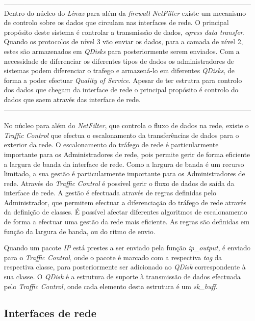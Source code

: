 ------------------------------------------------------------------------------------------------------------
 Dentro do núcleo do \textit{Linux} para além da \textit{firewall NetFilter} existe um mecanismo de controlo sobre os dados que circulam nas interfaces de rede.
 O principal propósito deste sistema é controlar a transmissão de dados, \textit{egress data transfer}.
 Quando os protocolos de nível 3 vão enviar os dados, para a camada de nível 2, estes são armazenados em \textit{QDisks} para posteriormente serem enviados.
 Com a necessidade de diferenciar os diferentes tipos de dados os administradores de sistemas podem diferenciar o trafego e armazená-lo em diferentes \textit{QDisks}, de forma a poder efectuar \textit{Quality of Service}.
Apesar de ter estrutra para controlo dos dados que chegam da interface de rede o principal propósito é controlo do dados que saem através das interface de rede.
------------------------------------------------------------------------------------------------------------

No núcleo para além do \textit{NetFilter}, que controla o fluxo de dados na rede, existe o \textit{Traffic Control} que efectua o escalonamento da transferências de dados para o exterior da rede.
O escalonamento do tráfego de rede é particularmente importante para os Administradores de rede, pois permite gerir de forma eficiente a largura de banda da interface de rede.
Como a largura de banda é um recurso limitado, a sua gestão é particularmente importante para os Administradores de rede.
Através do \textit{Traffic Control} é possível gerir o fluxo de dados de saída da interface de rede.
A gestão é efectuada através de regras definidas pelo Administrador, que permitem efectuar a diferenciação do tráfego de rede através da definição de classes.
É possível afectar diferentes algoritmos de escalonamento de forma a efectuar uma gestão da rede mais eficiente.
As regras são definidas em função da largura de banda, ou do ritmo de envio.

Quando um pacote \textit{IP} está prestes a ser enviado pela função \textit{ip\_output}, é enviado para o \textit{Traffic Control}, onde o pacote é marcado com a respectiva \textit{tag} da respectiva classe, para posteriormente ser adicionado ao \textit{QDisk} correspondente à sua classe.
O \textit{QDisk} é a estrutura de suporte à transmissão de dados efectuada pelo \textit{Traffic Control}, onde cada elemento desta estrutura é um \textit{sk\_buff}.


\subsection{Interfaces de rede}

